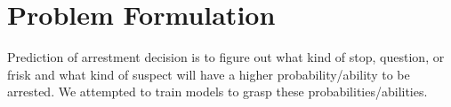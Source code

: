 
\section{Problem Formulation}

Prediction of arrestment decision is to figure out what kind of stop, question, or frisk and what kind of suspect will have a higher probability/ability to be arrested. We attempted to train models to grasp these probabilities/abilities.


